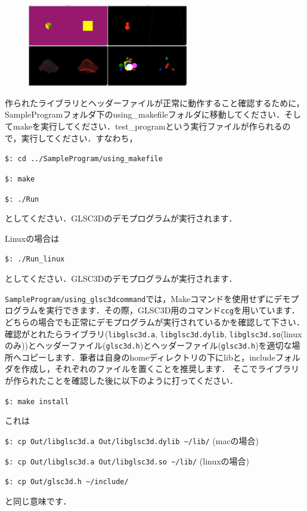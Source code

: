 \documentclass[a4paper,12pt]{jsarticle}%
\begin{document}
\begin{figure}
\vspace{-1\baselineskip}
	\includegraphics[width=70mm]{./Figures/eps/007.eps}
\end{figure}

作られたライブラリとヘッダーファイルが正常に動作すること確認するために，SampleProgramフォルダ下のusing\_makefileフォルダに移動してください．そしてmakeを実行してください．test\_programという実行ファイルが作られるので，実行してください．すなわち，

\verb|$: cd ../SampleProgram/using_makefile|

\verb|$: make|

\verb|$: ./Run|

\noindent
としてください．GLSC3Dのデモプログラムが実行されます．

Linuxの場合は

\verb|$: ./Run_linux|

\noindent
としてください．GLSC3Dのデモプログラムが実行されます．

\verb|SampleProgram/using_glsc3dcommand|では，Makeコマンドを使用せずにデモプログラムを実行できます．その際，GLSC3D用のコマンド\verb|ccg|を用いています．どちらの場合でも正常にデモプログラムが実行されているかを確認して下さい．確認がとれたらライブラリ(\verb|libglsc3d.a|, \verb|libglsc3d.dylib|, \verb|libglsc3d.so|(linuxのみ))とヘッダーファイル(\verb|glsc3d.h|)とヘッダーファイル(\verb|glsc3d.h|)を適切な場所へコピーします．筆者は自身のhomeディレクトリの下にlibと，includeフォルダを作成し，それぞれのファイルを置くことを推奨します．
そこでライブラリが作られたことを確認した後に以下のように打ってください．

\verb|$: make install |

これは

\verb|$: cp Out/libglsc3d.a Out/libglsc3d.dylib ~/lib/| (macの場合)

\verb|$: cp Out/libglsc3d.a Out/libglsc3d.so ~/lib/| (linuxの場合)

\verb|$: cp Out/glsc3d.h ~/include/|

と同じ意味です．
\end{document}
